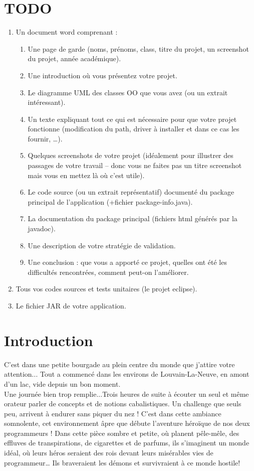 \documentclass[a4paper,titlepage]{article}
\begin{document}
	\section*{TODO}
	\begin{enumerate}
		\item Un document word comprenant : 
		\begin{enumerate}
			\item Une page de garde (noms, prénoms, class, titre du projet, un screenshot du projet, année académique).
			\item Une introduction où vous présentez votre projet.
			\item Le diagramme UML des classes OO que vous avez (ou un extrait intéressant).
			\item Un texte expliquant tout ce qui est nécessaire pour que votre projet fonctionne (modification du path, driver à installer et dans ce cas les fournir, …).
			\item Quelques screenshots de votre projet (idéalement pour illustrer des passages de votre travail – donc vous ne faites pas un titre screenshot mais vous en mettez là où c’est utile).
			\item Le code source (ou un extrait représentatif) documenté du package principal de l’application (+fichier package-info.java).
			\item La documentation du package principal (fichiers html générés par la javadoc).
			\item Une description de votre stratégie de validation.
			\item Une conclusion : que vous a apporté ce projet, quelles ont été les difficultés rencontrées, comment peut-on l’améliorer.
		\end{enumerate}
		\item Tous vos codes sources et tests unitaires (le projet eclipse).
		\item Le fichier JAR de votre application.
	\end{enumerate}
	\clearpage
	\section{Introduction}
	
	C’est dans une petite bourgade au plein centre du monde que j’attire votre attention... Tout a commencé dans les environs de Louvain-La-Neuve, en amont d’un lac, vide depuis un bon moment.\\

	Une journée bien trop remplie...Trois heures de suite à écouter un seul et même orateur parler de concepts et de notions cabalistiques. Un challenge que seuls peu, arrivent à endurer sans piquer du nez ! C’est dans cette ambiance somnolente, cet environnement âpre que débute l’aventure héroïque de nos deux programmeurs ! Dans cette pièce sombre et petite, où planent pêle-mêle, des effluves de transpirations, de cigarettes et de parfums, ils s’imaginent un monde idéal, où leurs héros seraient des rois devant leurs misérables vies de programmeur… Ils braveraient les démons et survivraient à ce monde hostile!\\
\end{document}
